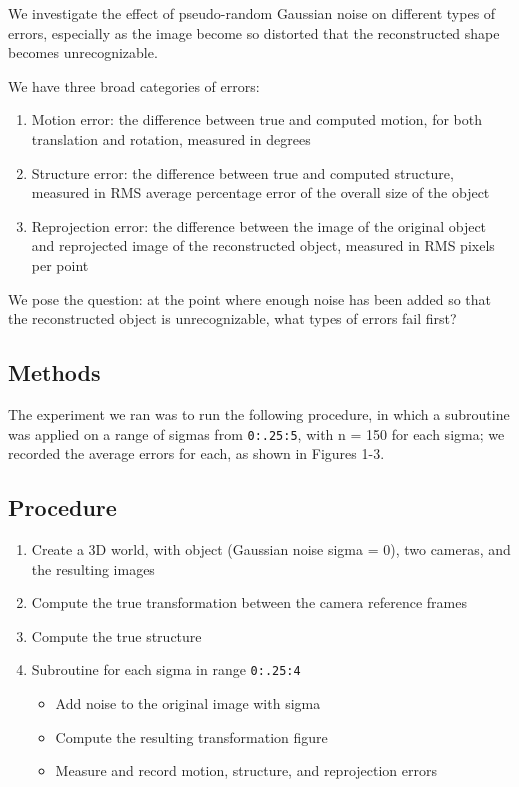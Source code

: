 \documentclass{article}
\begin{document}
We investigate the effect of pseudo-random Gaussian noise on different types of errors, especially as the image become so distorted that the reconstructed shape becomes unrecognizable.

We have three broad categories of errors:

\begin{enumerate}
  \item Motion error: the difference between true and computed motion, for both translation and rotation, measured in degrees
  \item Structure error: the difference between true and computed structure, measured in RMS average percentage error of the overall size of the object
  \item Reprojection error: the difference between the image of the original object and reprojected image of the reconstructed object, measured in RMS pixels per point
\end{enumerate} 

We pose the question: at the point where enough noise has been added so that the reconstructed object is unrecognizable, what types of errors fail first?




\subsection{Methods}

The experiment we ran was to run the following procedure, in which a subroutine was applied on a range of sigmas from \texttt{0:.25:5}, with n = 150 for each sigma; we recorded the average errors for each, as shown in Figures 1-3.

\subsection*{Procedure}



\begin{enumerate}
  \item Create a 3D world, with object (Gaussian noise sigma = 0), two cameras, and the resulting images
  \item Compute the true transformation between the camera reference frames
  \item Compute the true structure
  \item Subroutine for each sigma in range \texttt{0:.25:4}
  \begin{itemize}
  	\item Add noise to the original image with sigma
  	\item Compute the resulting transformation figure
  	\item Measure and record motion, structure, and reprojection errors
  \end{itemize}
\end{enumerate} 
\end{document}
